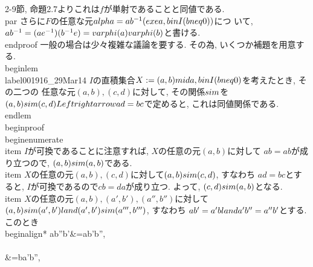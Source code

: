   2-9節, 命題2.7よりこれは$f$が単射であることと同値である.
  \\par さらに$F$の任意な元$\\alpha=ab^{-1}(\\exe a,b\\in I(b\\neq 0))$につ
  いて, $ab^{-1}=(ae^{-1})(b^{-1}e)=\\varphi(a)\\varphi(b)$と書ける.
 \\end{proof}
 一般の場合は少々複雑な議論を要する. その為, いくつか補題を用意する.
\\begin{lem}
 \\label{001916_29Mar14}
 $I$の直積集合$X:=\\{(a,b)\\mid a,b\\in I(b\\neq 0)\\}$を考えたとき, その二つの
 任意な元$(a,b),(c,d)$に対して, その関係$\\sim$を$(a,b)\\sim
 (c,d)\\Leftrightarrow ad=bc$で定めると, これは同値関係である.
\\end{lem}
\\begin{proof}
 \\begin{enumerate}
  \\item $I$が可換であることに注意すれば,  $X$の任意の元$(a,b)$に対して
        $ab=ab$が成り立つので, $(a,b)\\sim(a,b)$である.
  \\item $X$の任意の元$(a,b),(c,d)$に対して$(a,b)\\sim(c,d)$, すなわち
        $ad=bc$とすると, $I$が可換であるので$cb=da$が成り立つ. よって, 
        $(c,d)\\sim(a,b)$となる.
  \\item $X$の任意の元$(a,b),(a',b'),(a'',b'')$に対して
        $(a,b)\\sim(a',b')\\land(a',b')\\sim(a''',b''')$, すなわち
        $ab'=a'b\\land a'b''=a''b'$とする. このとき
        \\begin{align*}
          ab''b'&=ab'b'',\\\\
          &=ba'b'', \\\\
